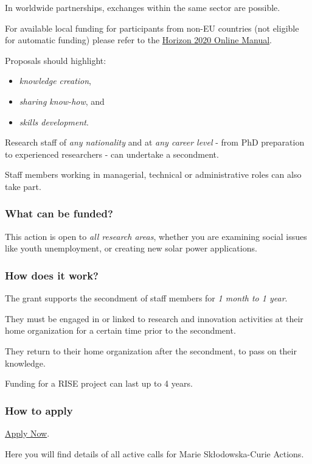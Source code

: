 \documentclass[oneside]{book}
\numberwithin{equation}{section}
\begin{document}
In worldwide partnerships, exchanges within the same sector are possible.

For available local funding for participants from non-EU countries (not eligible for automatic funding) please refer to the \href{http://ec.europa.eu/research/participants/docs/h2020-funding-guide/cross-cutting-issues/international-cooperation_en.htm}{Horizon 2020 Online Manual}.

%
Proposals should highlight:
\begin{itemize}
    \item \textit{knowledge creation},
    \item \textit{sharing know-how}, and
    \item \textit{skills development}.
\end{itemize}
Research staff of \textit{any nationality} and at \textit{any career level} - from PhD preparation to experienced researchers - can undertake a secondment.

Staff members working in managerial, technical or administrative roles can also take part.

\subsubsection{What can be funded?}
This action is open to \textit{all research areas}, whether you are examining social issues like youth unemployment, or creating new solar power applications.

\subsubsection{How does it work?}
The grant supports the secondment of staff members for \textit{1 month to 1 year}.

They must be engaged in or linked to research and innovation activities at their home organization for a certain time prior to the secondment.

%
They return to their home organization after the secondment, to pass on their knowledge.

%
Funding for a RISE project can last up to 4 years.

\subsubsection{How to apply}
\href{https://ec.europa.eu/research/mariecurieactions/actions/get-funding_en}{Apply Now}.

Here you will find details of all active calls for Marie Skłodowska-Curie Actions.
\end{document}
